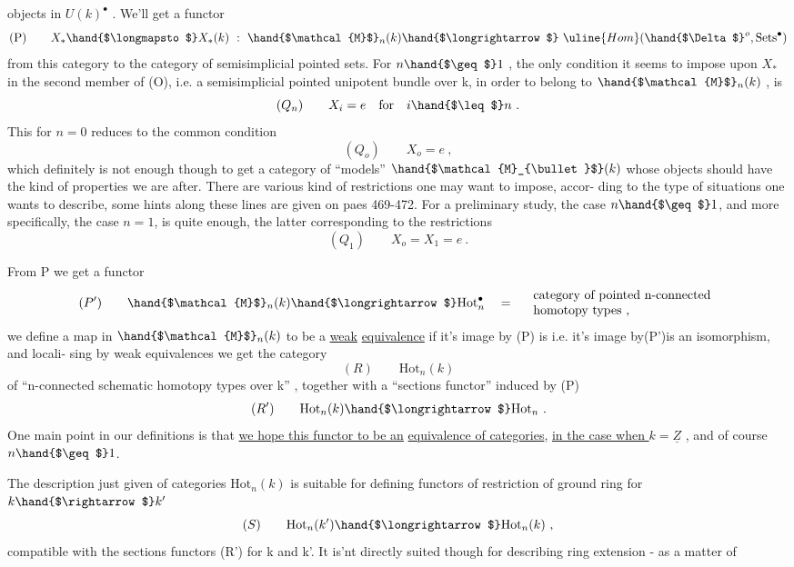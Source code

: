 
objects in $U(k)^\bullet$ . We'll get a functor
\[ \text{(P)}\qquad X_{*}\hand{$\longmapsto$}X_{*}(k) \ : \ \hand{$\mathcal{M}$}_{n}(k)\hand{$\longrightarrow$} \ \uline{Hom}(\hand{$\Delta$}^{o},\mathrm{Sets}^{\bullet}) \]
from this category to the category of semisimplicial pointed sets. 
For $n\hand{$\geq$}1$ , the only condition it seems to impose upon $X_{*}$ in the
second member of (O), i.e.  a semisimplicial pointed unipotent bundle over
k, in order to belong to $\hand{$\mathcal{M}$}_{n}(k)$ , is
\[ (Q_{n})\qquad X_{i} = e \quad\text{for}\quad i \hand{$\leq$} n \ . \]
This for $n=0$ reduces to the common condition
\[ (Q_{o})\qquad X_{o} = e \ , \]
which definitely is not enough though to get a category of ``models''
$\hand{$\mathcal{M}_{\bullet}$}(k)$ whose objects should have the kind of properties we are after.
There are various kind of  restrictions one may want to impose, accor-%
ding to the type of situations one wants to describe, some hints along
these lines are given on paes 469-472. For a preliminary study, the
case $n\hand{$\geq$} 1$, and more specifically, the case $n=1$, is quite enough, the
latter corresponding to the restrictions
\[ (Q_{1})\qquad X_{o} = X_{1} = e \ . \]

From P we get a functor
\[ (P')\qquad \hand{$\mathcal{M}$}_{n}(k) \hand{$\longrightarrow$} \mathrm{Hot}^{\bullet}_{n} \quad = \quad \begin{array}{l}\text{category of pointed n-connected}\\ \text{homotopy types ,}\end{array} \]
we define  a map in $\hand{$\mathcal{M}$}_{n}(k)$ to be a \uline{weak} \uline{equivalence} if it's
image by (P) is i.e. it's image by(P')is an isomorphism, and locali-%
sing by weak equivalences we get the category
\[ (R)\qquad \mathrm{Hot}_{n}(k) \]
of ``n-connected schematic homotopy types over k'' , together with a
``sections functor'' induced by (P)
\[ (R')\qquad \mathrm{Hot}_{n}(k) \hand{$\longrightarrow$} \mathrm{Hot}_{n} \ . \]
One main point in our definitions is that \uline{we hope this functor to be an}
\uline{equivalence of categories}, \uline{in the case when $k=\underline{Z}$} , and of course $n\hand{$\geq$} 1$.

The description just given of categories $\mathrm{Hot}_{n}(k)$ is suitable for
defining functors of restriction of ground ring for $k \hand{$\rightarrow$} k'$
\[ (S)\qquad \mathrm{Hot}_{n}(k')\hand{$\longrightarrow$} \mathrm{Hot}_{n}(k) \ , \]
compatible with the sections functors (R') for k and k'. It is'nt
directly suited though for describing ring extension - as a matter of

